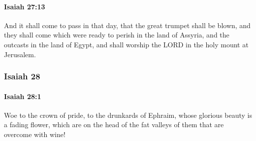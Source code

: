 		\paragraph{Isaiah 27:13} %
			\label{ISAIAH-27-13}

			And it shall come to pass in that day, that the great trumpet shall be blown, and they shall come which were ready to perish in the land of Assyria, and the outcasts in the land of Egypt, and shall worship the LORD in the holy mount at Jerusalem.

	\subsubsection{Isaiah 28} %
		\label{ISAIAH-28}

		\paragraph{Isaiah 28:1} %
			\label{ISAIAH-28-1}

			Woe to the crown of pride, to the drunkards of Ephraim, whose glorious beauty is a fading flower, which are on the head of the fat valleys of them that are overcome with wine!

